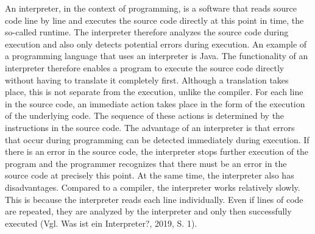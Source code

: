 An interpreter, in the context of programming, is a software that reads source code line by line and executes the source code directly at this point in time, the so-called runtime. The interpreter therefore analyzes the source code during execution and also only detects potential errors during execution. An example of a programming language that uses an interpreter is Java.
The functionality of an interpreter therefore enables a program to execute the source code directly without having to translate it completely first. Although a translation takes place, this is not separate from the execution, unlike the compiler. For each line in the source code, an immediate action takes place in the form of the execution of the underlying code. The sequence of these actions is determined by the instructions in the source code.
The advantage of an interpreter is that errors that occur during programming can be detected immediately during execution. If there is an error in the source code, the interpreter stops further execution of the program and the programmer recognizes that there must be an error in the source code at precisely this point.
At the same time, the interpreter also has disadvantages. Compared to a compiler, the interpreter works relatively slowly. This is because the interpreter reads each line individually. Even if lines of code are repeated, they are analyzed by the interpreter and only then successfully executed (Vgl. Was ist ein Interpreter?, 2019, S. 1).
